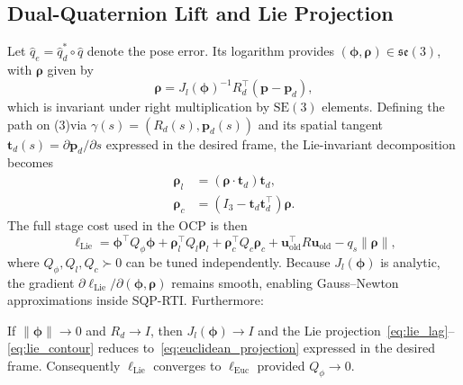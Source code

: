 \documentclass[letterpaper, 10pt, conference]{IEEEtran}
\newcommand{\SE}{\mathrm{SE}(3)}
\newcommand{\dq}{\hat{q}}
\newcommand{\dqE}{\dq_e}
\newcommand{\dqD}{\dq_d}
\begin{document}
\subsection{Dual-Quaternion Lift and Lie Projection}
Let $\dqE = \dqD^* \circ \dq$ denote the pose error. Its logarithm provides $(\bm{\phi},\bm{\rho}) \in \mathfrak{se}(3)$, with $\bm{\rho}$ given by
\begin{equation}
    \bm{\rho} = J_l(\bm{\phi})^{-1} R_d^\top(\mathbf{p} - \mathbf{p}_d),
    \label{eq:lie_rho}
\end{equation}
which is invariant under right multiplication by $\SE$ elements. Defining the path on \SE via $\gamma(s) = (R_d(s), \mathbf{p}_d(s))$ and its spatial tangent $\mathbf{t}_d(s) = \partial \mathbf{p}_d / \partial s$ expressed in the desired frame, the Lie-invariant decomposition becomes
\begin{align}
    \bm{\rho}_l &= (\bm{\rho} \cdot \mathbf{t}_d) \mathbf{t}_d, 
    \label{eq:lie_lag}\\
    \bm{\rho}_c &= (I_3 - \mathbf{t}_d \mathbf{t}_d^\top) \bm{\rho}.
    \label{eq:lie_contour}
\end{align}
The full stage cost used in the OCP is then
\begin{equation}
    \ell_{\text{Lie}} = \bm{\phi}^\top Q_\phi \bm{\phi} + \bm{\rho}_l^\top Q_l \bm{\rho}_l + \bm{\rho}_c^\top Q_c \bm{\rho}_c + \bm{u}_{\text{old}}^\top R \bm{u}_{\text{old}} - q_s \|\bm{\rho}\|,
    \label{eq:lie_stage_cost}
\end{equation}
where $Q_\phi, Q_l, Q_c \succ 0$ can be tuned independently. Because $J_l(\bm{\phi})$ is analytic, the gradient $\partial \ell_{\text{Lie}}/\partial (\bm{\phi},\bm{\rho})$ remains smooth, enabling Gauss--Newton approximations inside SQP-RTI. Furthermore:

\begin{proposition}
If $\|\bm{\phi}\| \to 0$ and $R_d \to I$, then $J_l(\bm{\phi}) \to I$ and the Lie projection~\eqref{eq:lie_lag}--\eqref{eq:lie_contour} reduces to~\eqref{eq:euclidean_projection} expressed in the desired frame. Consequently $\ell_{\text{Lie}}$ converges to $\ell_{\text{Euc}}$ provided $Q_\phi \to 0$.
\end{proposition}
\end{document}
